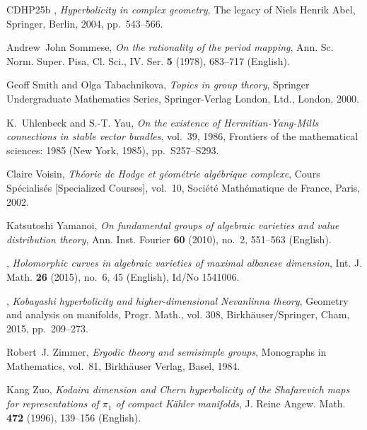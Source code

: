 \documentclass[english]{amsproc}
\theoremstyle{plain}
\theoremstyle{definition}
\theoremstyle{remark}
\theoremstyle{plain}
\numberwithin{equation}{thm} %
\begin{document}
\begin{thebibliography}{CDHP25b}
		\bysame, \emph{Hyperbolicity in complex geometry}, The legacy of {N}iels
		{H}enrik {A}bel, Springer, Berlin, 2004, pp.~543--566. 
		
		Andrew~John Sommese, \emph{On the rationality of the period mapping}, Ann. Sc.
		Norm. Super. Pisa, Cl. Sci., IV. Ser. \textbf{5} (1978), 683--717 (English).
		
		Geoff Smith and Olga Tabachnikova, \emph{Topics in group theory}, Springer
		Undergraduate Mathematics Series, Springer-Verlag London, Ltd., London, 2000.
		
		K.~Uhlenbeck and S.-T. Yau, \emph{On the existence of
			{H}ermitian-{Y}ang-{M}ills connections in stable vector bundles}, vol.~39,
		1986, Frontiers of the mathematical sciences: 1985 (New York, 1985),
		pp.~S257--S293. 
		
		Claire Voisin, \emph{Th\'eorie de {H}odge et g\'eom\'etrie alg\'ebrique
			complexe}, Cours Sp\'ecialis\'es [Specialized Courses], vol.~10,
		Soci\'et\'e{} Math\'ematique de France, Paris, 2002. 
		
		Katsutoshi Yamanoi, \emph{On fundamental groups of algebraic varieties and
			value distribution theory}, Ann. Inst. Fourier \textbf{60} (2010), no.~2,
		551--563 (English).
		
		\bysame, \emph{Holomorphic curves in algebraic varieties of maximal albanese
			dimension}, Int. J. Math. \textbf{26} (2015), no.~6, 45 (English), Id/No
		1541006.
		
		\bysame, \emph{Kobayashi hyperbolicity and higher-dimensional {N}evanlinna
			theory}, Geometry and analysis on manifolds, Progr. Math., vol. 308,
		Birkh\"auser/Springer, Cham, 2015, pp.~209--273. 
		
		Robert~J. Zimmer, \emph{Ergodic theory and semisimple groups}, Monographs in
		Mathematics, vol.~81, Birkh\"{a}user Verlag, Basel, 1984. 
		
		Kang Zuo, \emph{Kodaira dimension and {Chern} hyperbolicity of the
			{Shafarevich} maps for representations of {{\(\pi_ 1\)}} of compact
			{K{\"a}hler} manifolds}, J. Reine Angew. Math. \textbf{472} (1996), 139--156
		(English).
		
	\end{thebibliography}
	
\end{document}
